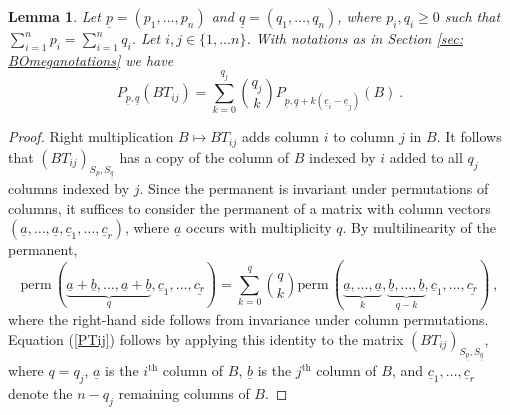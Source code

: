\documentclass[10pt]{amsart}
\newcommand{\pp}{{\underline{p}}}
\newcommand{\qq}{{\underline{q}}}
\newcommand{\eee}{{\underline{e}}}
\newcommand{\perm}{\mathrm{perm}\,}
\theoremstyle{plain}
\newtheorem{lem}[thm]{Lemma}
\newcommand{\0}{\color{blue}{\mathsf{0}}}
\begin{document}
\begin{lem}\label{lemP} Let $\pp = (p_1,\ldots, p_n)$ and $\qq=(q_1,\ldots, q_n)$, where $p_i,q_i \geq 0$ such that $\sum_{i=1}^n p_i = \sum_{i=1}^n q_i$.
Let $i,j\in \{1,\ldots n\}$. With notations as in Section  \ref{sec: BOmeganotations} we have
\begin{equation}\label{PTij}
P_{\pp,\qq}(BT_{ij})=\sum_{k=0}^{q_j}\genfrac(){0pt}{}{q_j}{k}P_{\pp,\qq+k(\eee_i-\eee_j)}(B)\ .
\end{equation}
\end{lem}
\begin{proof}
Right multiplication $B \mapsto B T_{ij}$ adds column $i$ to column $j$ in $B$. 
It follows that $(BT_{ij})_{S_\pp, S_\qq}$ has a  copy of the  column of $B$ indexed by $i$ added to all $q_j$ columns indexed by $j$.   Since the permanent is invariant under permutations of  columns, it suffices to consider 
the permanent of a matrix with column vectors  $(\underline{a} , \ldots, \underline{a}, \underline{c}_1, \ldots, \underline{c}_r)$, where $\underline{a}$ occurs with multiplicity $q$. By multilinearity of the permanent, 
\[ \perm ( \underbrace{\underline{a} +\underline{b}, \ldots,  \underline{a}+\underline{b}}_q, \underline{c}_1, \ldots, \underline{c_r})  = \sum_{k=0}^q \binom{q}{k}   \perm ( \underbrace{\underline{a} , \ldots,  \underline{a}}_k, \underbrace{ \underline{b} ,\ldots,   \underline{b}}_{q-k}, \underline{c}_1, \ldots, \underline{c_r})\ ,\]
where the right-hand side follows from invariance under column permutations.   Equation (\ref{PTij}) follows by applying this identity  to the matrix  $(BT_{ij})_{S_\pp, S_\qq}$, where $q=q_j$, $\underline{a}$ is the $i^{\mathrm{th}}$ column of $B$,
$\underline{b}$ is the $j^{\mathrm{th}}$ column of $B$, and $\underline{c}_1,\ldots, \underline{c}_r$ denote the $n-q_j$ remaining columns of $B$.
\end{proof}
\end{document}
